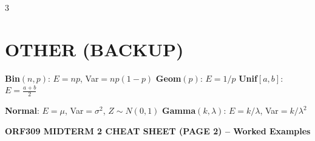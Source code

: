 \documentclass[7pt,landscape]{extarticle}
\begin{document}
\begin{multicols}{3}
\section*{OTHER (BACKUP)}

\textbf{Bin}$(n,p)$: $E=np$, Var$=np(1-p)$ \quad \textbf{Geom}$(p)$: $E=1/p$ \quad \textbf{Unif}$[a,b]$: $E=\frac{a+b}{2}$

\textbf{Normal}: $E=\mu$, Var$=\sigma^2$, $Z \sim N(0,1)$ \quad \textbf{Gamma}$(k,\lambda)$: $E=k/\lambda$, Var$=k/\lambda^2$

\end{multicols}

\newpage

\noindent\textbf{ORF309 MIDTERM 2 CHEAT SHEET (PAGE 2) -- Worked Examples}

\vspace{1pt}
\end{document}
